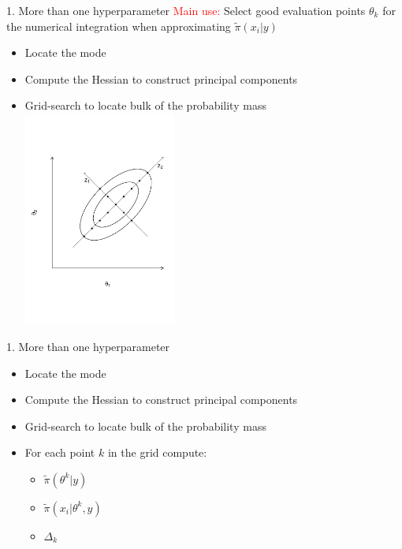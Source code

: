 \documentclass[
  ignorenonframetext,
]{beamer}
\providecommand{\tightlist}{%
  \setlength{\itemsep}{0pt}\setlength{\parskip}{0pt}}
\begin{document}
\begin{frame}{1. More than one hyperparameter}
\protect\hypertarget{more-than-one-hyperparameter-2}{}
\textcolor{red}{Main use:} Select good evaluation points \({\theta}_k\)
for the numerical integration when approximating
\(\widetilde{\pi}(x_i|{y})\)

\begin{itemize}
\item
  Locate the mode
\item
  Compute the Hessian to construct principal components
\item
  Grid-search to locate bulk of the probability mass
  \includegraphics[width=5cm]{./graphics/ellipse3}
\end{itemize}
\end{frame}

\begin{frame}{1. More than one hyperparameter}
\protect\hypertarget{more-than-one-hyperparameter-3}{}
\begin{itemize}
\item
  Locate the mode
\item
  Compute the Hessian to construct principal components
\item
  Grid-search to locate bulk of the probability mass
\item
  For each point \(k\) in the grid compute:

  \begin{itemize}
  \tightlist
  \item
    \(\widetilde{\pi}(\theta^k|y)\)
  \item
    \(\widetilde{\pi}(x_i|\theta^k,y)\)
  \item
    \(\Delta_k\)
  \end{itemize}
\end{itemize}
\end{frame}
\end{document}
